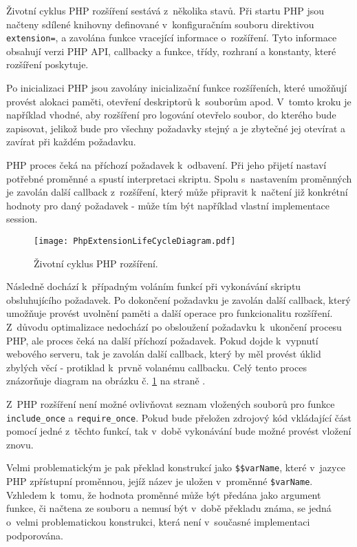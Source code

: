 \documentclass[czech]{ExcelAtFIT}
\newcommand{\function}[1]{\texttt{#1}}
\begin{document}
	Životní cyklus PHP rozšíření sestává z~několika stavů.\cite{phpExtensionLife} Při startu PHP jsou načteny sdílené knihovny definované v~konfiguračním souboru direktivou \function{extension=}, a zavolána funkce vracející informace o~rozšíření. Tyto informace obsahují verzi PHP API, callbacky a funkce, třídy, rozhraní a konstanty, které rozšíření poskytuje.\cite{phpExtensionStructure}

	Po inicializaci PHP jsou zavolány inicializační funkce rozšířeních, které umožňují provést alokaci paměti, otevření deskriptorů k~souborům apod. V~tomto kroku je například vhodné, aby rozšíření pro logování otevřelo soubor, do kterého bude zapisovat, jelikož bude pro všechny požadavky stejný a je zbytečné jej otevírat a zavírat při každém požadavku.

	PHP proces čeká na příchozí požadavek k~odbavení. Při jeho přijetí nastaví potřebné proměnné a spustí interpretaci skriptu. Spolu s~nastavením proměnných je zavolán další callback z~rozšíření, který může připravit k~načtení již konkrétní hodnoty pro daný požadavek - může tím být například vlastní implementace session.

	\begin{figure}[t]
		\centering
		\texttt{[image: PhpExtensionLifeCycleDiagram.pdf]}
		\caption{Životní cyklus PHP rozšíření.}
		\label{fig:phpExtensionLifeCycle}
	\end{figure}


	Následně dochází k~případným voláním funkcí při vykonávání skriptu obsluhujícího požadavek. Po dokončení požadavku je zavolán další callback, který umožňuje provést uvolnění paměti a další operace pro funkcionalitu rozšíření. Z~důvodu optimalizace nedochází po obsloužení požadavku k~ukončení procesu PHP, ale proces čeká na další příchozí požadavek. Pokud dojde k~vypnutí webového serveru, tak je zavolán další callback, který by měl provést úklid zbylých věcí - protiklad k~prvně volanému callbacku. Celý tento proces znázorňuje diagram na obrázku č. \ref{fig:phpExtensionLifeCycle} na straně \pageref{fig:phpExtensionLifeCycle}.


	Z~PHP rozšíření není možné ovlivňovat seznam vložených souborů pro funkce \function{include\_once} a \function{require\_once}. Pokud bude přeložen zdrojový kód vkládající část pomocí jedné z~těchto funkcí, tak v~době vykonávání bude možné provést vložení znovu.

	Velmi problematickým je pak překlad konstrukcí jako \function{\$\$varName}, které v~jazyce PHP zpřístupní proměnnou, jejíž název je uložen v~proměnné \function{\$varName}. Vzhledem k~tomu, že hodnota proměnné může být předána jako argument funkce, či načtena ze souboru a nemusí být v~době překladu známa, se jedná o~velmi problematickou konstrukci, která není v~současné implementaci podporována.
\end{document}
